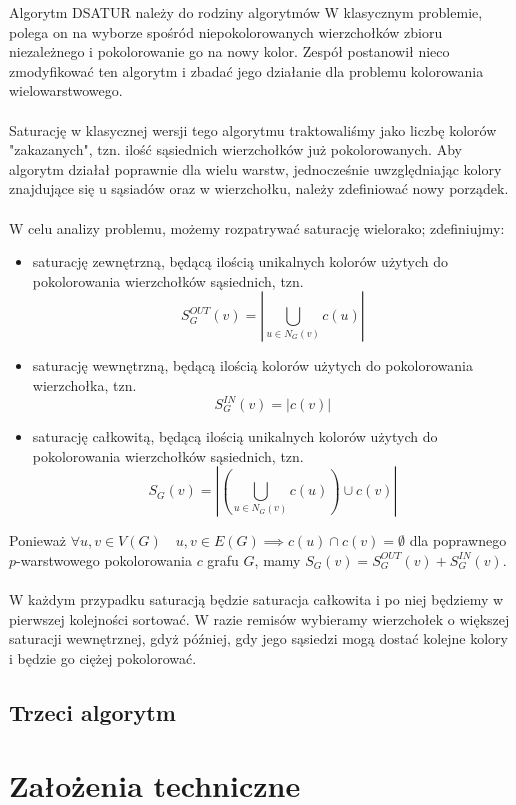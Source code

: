 \documentclass[10pt,a4paper]{article}
\begin{document}
	Algorytm DSATUR należy do rodziny algorytmów  W klasycznym problemie, polega on na wyborze spośród niepokolorowanych wierzchołków zbioru niezależnego i pokolorowanie go na nowy kolor. Zespół postanowił nieco zmodyfikować ten algorytm i zbadać jego działanie dla problemu kolorowania wielowarstwowego.
	\\~\\
	Saturację w klasycznej wersji tego algorytmu traktowaliśmy jako liczbę kolorów "zakazanych", tzn. ilość sąsiednich wierzchołków już pokolorowanych. Aby algorytm działał poprawnie dla wielu warstw, jednocześnie uwzględniając kolory znajdujące się u sąsiadów oraz w wierzchołku, należy zdefiniować nowy porządek. 
	\\~\\
	W celu analizy problemu, możemy rozpatrywać saturację wielorako; zdefiniujmy:
	\begin{itemize}
		\item saturację zewnętrzną, będącą ilością unikalnych kolorów użytych do pokolorowania wierzchołków sąsiednich, tzn.
		\[S^{OUT}_{G}(v) = \left|\bigcup_{u \in N_{G}(v)} c(u)\right|\]
		\item saturację wewnętrzną, będącą ilością kolorów użytych do pokolorowania wierzchołka, tzn.
		\[S^{IN}_{G}(v) = |c(v)|\]
		\item saturację całkowitą, będącą ilością unikalnych kolorów użytych do pokolorowania wierzchołków sąsiednich, tzn.
		\[S_{G}(v) = \left|\left(\bigcup_{u \in N_{G}(v)} c(u) \right) \cup c(v)\right|\]
	\end{itemize}
	Ponieważ $\forall u,v \in V(G) \quad {u, v} \in E(G) \implies c(u) \cap c(v) = \emptyset$ dla poprawnego $p$-warstwowego pokolorowania $c$ grafu $G$, mamy $S_{G}(v) = S^{OUT}_{G}(v) + S^{IN}_{G}(v)$. 
	\\~\\
	W każdym przypadku saturacją będzie saturacja całkowita i po niej będziemy w pierwszej kolejności sortować. W razie remisów wybieramy wierzchołek o większej saturacji wewnętrznej, gdyż później, gdy jego sąsiedzi mogą dostać kolejne kolory i będzie go ciężej pokolorować.

	\subsection{Trzeci algorytm}
	
	\section{Założenia techniczne}
	
\end{document}
